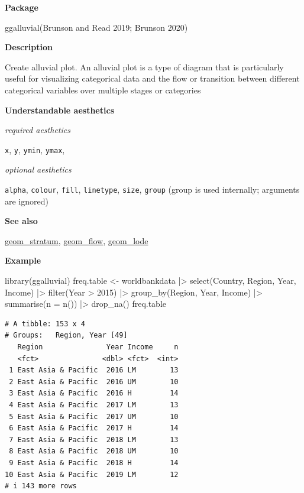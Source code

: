\documentclass[
  letterpaper,
  DIV=11,
  numbers=noendperiod]{scrreprt}
\newenvironment{Shaded}{\begin{snugshade}}{\end{snugshade}}
\newcommand{\AttributeTok}[1]{\textcolor[rgb]{0.40,0.45,0.13}{#1}}
\newcommand{\DecValTok}[1]{\textcolor[rgb]{0.68,0.00,0.00}{#1}}
\newcommand{\FunctionTok}[1]{\textcolor[rgb]{0.28,0.35,0.67}{#1}}
\newcommand{\NormalTok}[1]{\textcolor[rgb]{0.00,0.23,0.31}{#1}}
\newcommand{\OtherTok}[1]{\textcolor[rgb]{0.00,0.23,0.31}{#1}}
\newcommand{\SpecialCharTok}[1]{\textcolor[rgb]{0.37,0.37,0.37}{#1}}
\begin{document}
\textbf{Package}

ggalluvial(Brunson and Read 2019; Brunson 2020)

\textbf{Description}

Create alluvial plot. An alluvial plot is a type of diagram that is
particularly useful for visualizing categorical data and the flow or
transition between different categorical variables over multiple stages
or categories

\textbf{Understandable aesthetics}

\emph{required aesthetics}

\texttt{x}, \texttt{y}, \texttt{ymin}, \texttt{ymax},

\emph{optional aesthetics}

\texttt{alpha}, \texttt{colour}, \texttt{fill}, \texttt{linetype},
\texttt{size}, \texttt{group} (group is used internally; arguments are
ignored)

\textbf{See also}

\hyperref[stratum]{geom\_stratum}, \hyperref[flow]{geom\_flow},
\hyperref[lode]{geom\_lode}

\textbf{Example}

\begin{Shaded}
\begin{Highlighting}[]
\FunctionTok{library}\NormalTok{(ggalluvial)}
\NormalTok{freq.table }\OtherTok{\textless{}{-}}\NormalTok{ worldbankdata }\SpecialCharTok{|\textgreater{}}
  \FunctionTok{select}\NormalTok{(Country, Region, Year, Income) }\SpecialCharTok{|\textgreater{}}
  \FunctionTok{filter}\NormalTok{(Year }\SpecialCharTok{\textgreater{}} \DecValTok{2015}\NormalTok{) }\SpecialCharTok{|\textgreater{}}
  \FunctionTok{group\_by}\NormalTok{(Region, Year, Income) }\SpecialCharTok{|\textgreater{}}
  \FunctionTok{summarise}\NormalTok{(}\AttributeTok{n =} \FunctionTok{n}\NormalTok{()) }\SpecialCharTok{|\textgreater{}}
  \FunctionTok{drop\_na}\NormalTok{()}
\NormalTok{freq.table}
\end{Highlighting}
\end{Shaded}

\begin{verbatim}
# A tibble: 153 x 4
# Groups:   Region, Year [49]
   Region               Year Income     n
   <fct>               <dbl> <fct>  <int>
 1 East Asia & Pacific  2016 LM        13
 2 East Asia & Pacific  2016 UM        10
 3 East Asia & Pacific  2016 H         14
 4 East Asia & Pacific  2017 LM        13
 5 East Asia & Pacific  2017 UM        10
 6 East Asia & Pacific  2017 H         14
 7 East Asia & Pacific  2018 LM        13
 8 East Asia & Pacific  2018 UM        10
 9 East Asia & Pacific  2018 H         14
10 East Asia & Pacific  2019 LM        12
# i 143 more rows
\end{verbatim}
\end{document}
